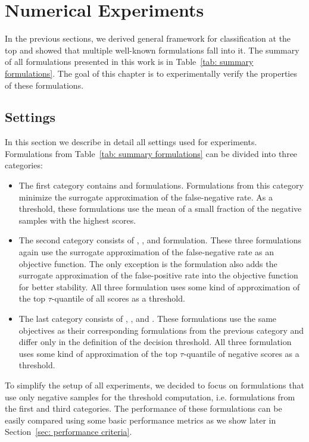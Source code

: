 \chapter{Numerical Experiments}\label{chap: experiments}

In the previous sections, we derived general framework for classification at the top and showed that multiple well-known formulations fall into it. The summary of all formulations presented in this work is in Table~\ref{tab: summary formulations}. The goal of this chapter is to experimentally verify the properties of these formulations. 

\section{Settings}\label{sec: settings}

In this section we describe in detail all settings used for experiments. Formulations from Table~\ref{tab: summary formulations} can be divided into three categories:
\begin{itemize}
  \item The first category contains \TopPush and \TopPushK formulations. Formulations from this category minimize the surrogate approximation of the false-negative rate. As a threshold, these formulations use the mean of a small fraction of the negative samples with the highest scores.
  \item The second category consists of \Grill, \TopMeanK, and \PatMat formulation. These three formulations again use the surrogate approximation of the false-negative rate as an objective function. The only exception is the \Grill formulation also adds the surrogate approximation of the false-positive rate into the objective function for better stability. All three formulation uses some kind of approximation of the top $\tau$-quantile of all scores as a threshold.
  \item The last category consists of \GrillNP, \tauFPL, and \PatMatNP. These formulations use the same objectives as their corresponding formulations from the previous category and differ only in the definition of the decision threshold. All three formulation uses some kind of approximation of the top $\tau$-quantile of negative scores as a threshold.
\end{itemize}
To simplify the setup of all experiments, we decided to focus on formulations that use only negative samples for the threshold computation, i.e. formulations from the first and third categories. The performance of these formulations can be easily compared using some basic performance metrics as we show later in Section~\ref{sec: performance criteria}.

